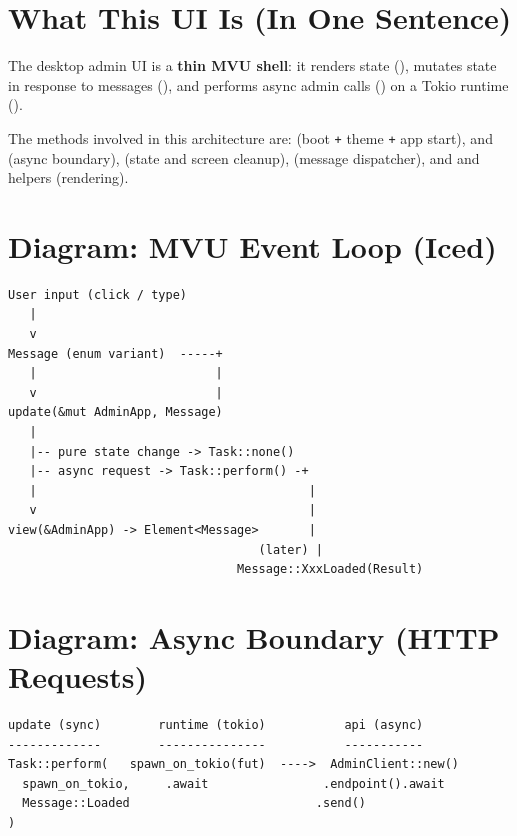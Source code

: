 \section{What This UI Is (In One Sentence)}
\label{sec:ch16-oneline}

The desktop admin UI is a \textbf{thin MVU shell}: it renders state (), mutates state in response to messages (), and performs async admin calls () on a Tokio runtime ().

The methods involved in this architecture are:  (boot \texttt{+} theme \texttt{+} app start),  and  (async boundary),  (state and screen cleanup),  (message dispatcher), and  and  helpers (rendering).

\section{Diagram: MVU Event Loop (Iced)}
\label{sec:ch16-mvu-loop}

\begin{verbatim}
User input (click / type)
   |
   v
Message (enum variant)  -----+
   |                         |
   v                         |
update(&mut AdminApp, Message)
   |
   |-- pure state change -> Task::none()
   |-- async request -> Task::perform() -+
   |                                      |
   v                                      |
view(&AdminApp) -> Element<Message>       |
                                   (later) |
                                Message::XxxLoaded(Result)
\end{verbatim}

\section{Diagram: Async Boundary (HTTP Requests)}
\label{sec:ch16-async-boundary}

\begin{verbatim}
update (sync)        runtime (tokio)           api (async)
-------------        ---------------           -----------
Task::perform(   spawn_on_tokio(fut)  ---->  AdminClient::new()
  spawn_on_tokio,     .await                .endpoint().await
  Message::Loaded                          .send()
)
\end{verbatim}

